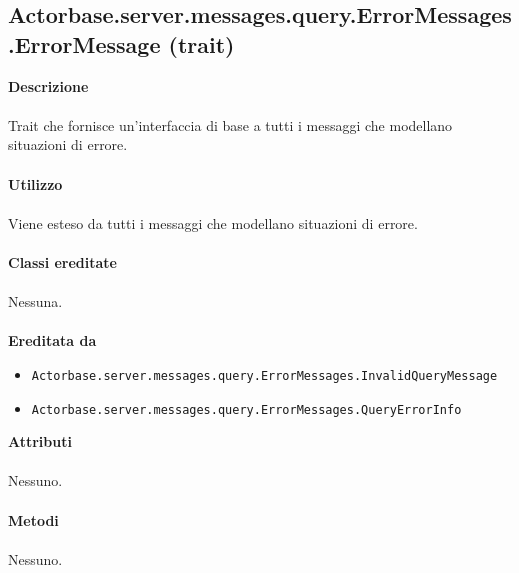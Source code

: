 \documentclass[a4paper]{article}
\begin{document}
	\subsection{Actorbase.server.messages.query.ErrorMessages.ErrorMessage (trait)}
		\textbf{Descrizione}
			\\ \\
			Trait che fornisce un'interfaccia di base a tutti i messaggi che modellano situazioni di errore.
			\\ \\
		\textbf{Utilizzo}
			\\ \\
			Viene esteso da tutti i messaggi che modellano situazioni di errore.
			\\ \\
		\textbf{Classi ereditate}
			\\ \\
			Nessuna.
			\\ \\
		\textbf{Ereditata da}
			\begin{itemize}
				\item \texttt{Actorbase.server.messages.query.ErrorMessages.InvalidQueryMessage}
				\item \texttt{Actorbase.server.messages.query.ErrorMessages.QueryErrorInfo}
			\end{itemize}
		\textbf{Attributi}
			\\ \\
			Nessuno.
			\\ \\
		\textbf{Metodi}
			\\ \\
			Nessuno.
			
\end{document}
